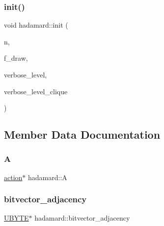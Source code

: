 \subsubsection{\texorpdfstring{init()}{init()}}
{\footnotesize\ttfamily void hadamard\+::init (\begin{DoxyParamCaption}\item[{\mbox{\hyperlink{galois_8h_a09fddde158a3a20bd2dcadb609de11dc}{I\+NT}}}]{n,  }\item[{\mbox{\hyperlink{galois_8h_a09fddde158a3a20bd2dcadb609de11dc}{I\+NT}}}]{f\+\_\+draw,  }\item[{\mbox{\hyperlink{galois_8h_a09fddde158a3a20bd2dcadb609de11dc}{I\+NT}}}]{verbose\+\_\+level,  }\item[{\mbox{\hyperlink{galois_8h_a09fddde158a3a20bd2dcadb609de11dc}{I\+NT}}}]{verbose\+\_\+level\+\_\+clique }\end{DoxyParamCaption})}



\subsection{Member Data Documentation}
\mbox{\label{classhadamard_a5739909fa42b08637718cd2bf5bce169}} 
\subsubsection{\texorpdfstring{A}{A}}
{\footnotesize\ttfamily \mbox{\hyperlink{classaction}{action}}$\ast$ hadamard\+::A}

\mbox{\label{classhadamard_af616eb4ee1edff0fc597962d98fb6239}} 
\subsubsection{\texorpdfstring{bitvector\+\_\+adjacency}{bitvector\_adjacency}}
{\footnotesize\ttfamily \mbox{\hyperlink{galois_8h_a122c4acf389c050379f00341fdcd5812}{U\+B\+Y\+TE}}$\ast$ hadamard\+::bitvector\+\_\+adjacency}

\mbox{\label{classhadamard_a41b951979c27c0c4855d6203899c94bb}} 
